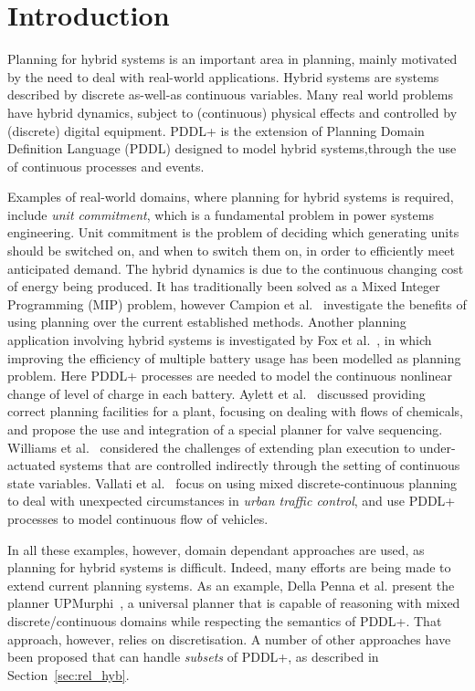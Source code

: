 \section{Introduction}

Planning for hybrid systems is an important area in planning, mainly motivated by the need to deal with real-world applications. Hybrid systems are systems described by discrete as-well-as continuous variables.
Many real world problems have hybrid dynamics, subject to (continuous) physical effects and controlled by (discrete) digital equipment. PDDL+ \cite{pddl+} is the extension of Planning Domain Definition Language (PDDL) designed to model hybrid systems,through the use of continuous processes and events.

Examples of real-world domains, where planning for hybrid systems is required, include \textit{unit commitment}, which is a fundamental problem in power systems engineering. Unit commitment is the problem of deciding which generating units should be switched on, and when to switch them on, in order to efficiently meet anticipated demand. The hybrid dynamics is due to the continuous changing cost of energy being produced. It has traditionally been solved as a Mixed Integer Programming (MIP) problem, however Campion et al.~\cite{ucp} investigate the benefits of using planning over the current established methods.
Another planning application involving hybrid systems is investigated by Fox et al.~\cite{battery, fox2012plan}, in which improving the efficiency of multiple battery usage has been modelled as planning problem. Here PDDL+ processes are needed to model the continuous nonlinear change of level of charge in each battery. Aylett et al.~\cite{aylett1998ai} discussed providing correct planning facilities for a plant, focusing on dealing with flows of chemicals, and propose the use and integration of a special planner for valve sequencing. Williams et al.~\cite{leaute2005coordinating} considered the challenges of extending plan execution to under-actuated systems that are controlled indirectly through the setting of continuous state variables.
Vallati et al.~\cite{utc} focus on using mixed discrete-continuous planning to deal with unexpected circumstances in \textit{urban traffic control}, and use PDDL+ processes to model continuous flow of vehicles. 

In all these examples, however, domain dependant approaches are used, as planning for hybrid systems is difficult. Indeed, many efforts are being made to extend current planning systems. As an example, Della Penna et al. present the planner {UPMurphi}~\cite{upmurphi}, a universal planner that is capable of reasoning with mixed discrete/continuous domains while respecting the semantics of PDDL+. That approach, however, relies on discretisation. A number of other approaches have been proposed that can handle \textit{subsets} of PDDL+, as described in Section~\ref{sec:rel_hyb}.


